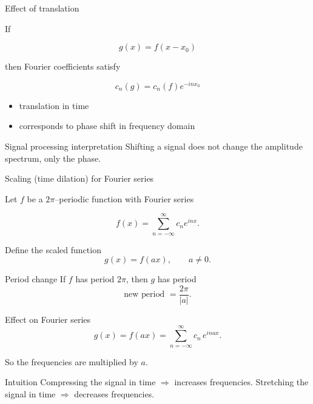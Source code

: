 \documentclass[aspectratio=169]{beamer}
\begin{document}
\begin{frame}{Effect of translation}

If

\[
g(x)=f(x-x_0)
\]

then Fourier coefficients satisfy

\[
c_n(g)=c_n(f)e^{-inx_0}
\]
\pause
\begin{itemize}
    \item translation in time
    \item corresponds to phase shift in frequency domain
\end{itemize}

\begin{block}{Signal processing interpretation}
Shifting a signal does not change the amplitude spectrum,
only the phase.
\end{block}

\end{frame}

\begin{frame}{Scaling (time dilation) for Fourier series}

Let $f$ be a $2\pi$–periodic function with Fourier series

\[
f(x)=\sum_{n=-\infty}^{\infty} c_n e^{inx}.
\]

Define the scaled function
\[
g(x)=f(ax), \qquad a\neq 0.
\]
\pause
\begin{block}{Period change}
If $f$ has period $2\pi$, then $g$ has period
\[
\text{new period }=\frac{2\pi}{|a|}.
\]
\end{block}

\begin{block}{Effect on Fourier series}
\[
g(x)=f(ax)
=
\sum_{n=-\infty}^{\infty}
c_n\,e^{ina x}.
\]

So the frequencies are multiplied by $a$.
\end{block}

\begin{block}{Intuition}
Compressing the signal in time $\Rightarrow$ increases frequencies.  
Stretching the signal in time $\Rightarrow$ decreases frequencies.
\end{block}

\end{frame}
\end{document}
